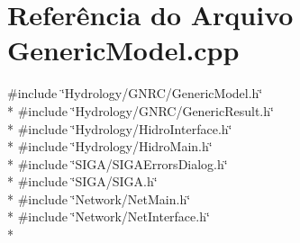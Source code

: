 \section{Referência do Arquivo Generic\+Model.\+cpp}
\label{_generic_model_8cpp}
{\ttfamily \#include \char`\"{}Hydrology/\+G\+N\+R\+C/\+Generic\+Model.\+h\char`\"{}}\\*
{\ttfamily \#include \char`\"{}Hydrology/\+G\+N\+R\+C/\+Generic\+Result.\+h\char`\"{}}\\*
{\ttfamily \#include \char`\"{}Hydrology/\+Hidro\+Interface.\+h\char`\"{}}\\*
{\ttfamily \#include \char`\"{}Hydrology/\+Hidro\+Main.\+h\char`\"{}}\\*
{\ttfamily \#include \char`\"{}S\+I\+G\+A/\+S\+I\+G\+A\+Errors\+Dialog.\+h\char`\"{}}\\*
{\ttfamily \#include \char`\"{}S\+I\+G\+A/\+S\+I\+G\+A.\+h\char`\"{}}\\*
{\ttfamily \#include \char`\"{}Network/\+Net\+Main.\+h\char`\"{}}\\*
{\ttfamily \#include \char`\"{}Network/\+Net\+Interface.\+h\char`\"{}}\\*
